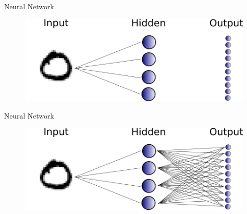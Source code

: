 \begin{frame}[plain]{Neural Network}
\begin{figure}
\includegraphics[width = 0.8 \textwidth]{"simple neural net half lines"}
\end{figure}
\end{frame}


\begin{frame}[plain]{Neural Network}
\begin{figure}
\includegraphics[width = 0.8 \textwidth]{"simple neural net all lines"}
\end{figure}
\end{frame}


